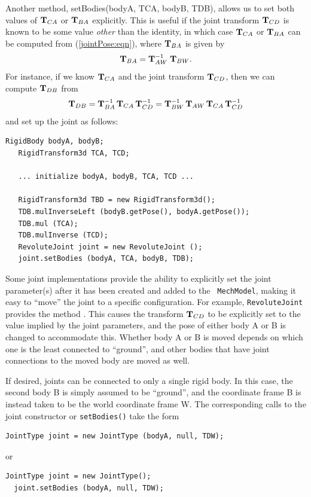 Another method,
{setBodies(bodyA, TCA, bodyB, TDB)}, allows us to set both values of
${\bf T}_{CA}$ or ${\bf T}_{BA}$ explicitly. This is useful if the joint
transform ${\bf T}_{CD}$ is known to be some value {\it other} than the
identity, in which case ${\bf T}_{CA}$ or ${\bf T}_{BA}$ can be computed
from (\ref{jointPose:eqn}), where ${\bf T}_{BA}$ is given by
%
\begin{equation}
{\bf T}_{BA} = {\bf T}_{AW}^{-1} \; {\bf T}_{BW}.
\end{equation}
%
For instance, if we know ${\bf T}_{CA}$ and the joint transform ${\bf T}_{CD}$,
then we can compute ${\bf T}_{DB}$
from
%
\begin{equation}
{\bf T}_{DB} = {\bf T}_{BA}^{-1} \, {\bf T}_{CA} \, {\bf T}_{CD}^{-1} = 
{\bf T}_{BW}^{-1}  \, {\bf T}_{AW} \, {\bf T}_{CA} \, {\bf T}_{CD}^{-1}
\end{equation}
%
and set up the joint as follows:
%
\begin{lstlisting}[]
   RigidBody bodyA, bodyB;
   RigidTransform3d TCA, TCD;

   ... initialize bodyA, bodyB, TCA, TCD ...
   
   RigidTransform3d TBD = new RigidTransform3d();
   TDB.mulInverseLeft (bodyB.getPose(), bodyA.getPose());
   TDB.mul (TCA);
   TDB.mulInverse (TCD);
   RevoluteJoint joint = new RevoluteJoint ();
   joint.setBodies (bodyA, TCA, bodyB, TDB);
\end{lstlisting}
%

Some joint implementations provide the ability to explicitly set the
joint parameter(s) after it has been created and added to the {\tt
MechModel}, making it easy to ``move'' the joint to a specific
configuration. For example, {\tt RevoluteJoint} provides the method
.
This causes the transform ${\bf T}_{CD}$ to be explicitly set to the value
implied by the joint parameters, and the pose of either body A or B is
changed to accommodate this. Whether body A or B is moved depends on
which one is the least connected to ``ground'', and other bodies that have
joint connections to the moved body are moved as well.

If desired, joints can be connected to only a single rigid body. In
this case, the second body B is simply assumed to be ``ground'', and the
coordinate frame B is instead taken
to be the world coordinate frame W. The corresponding calls
to the joint constructor or {\tt setBodies()} take the
form
%
\begin{lstlisting}[]
  JointType joint = new JointType (bodyA, null, TDW);
\end{lstlisting}
%
or
%
\begin{lstlisting}[]
  JointType joint = new JointType();
  joint.setBodies (bodyA, null, TDW);
\end{lstlisting}
%

